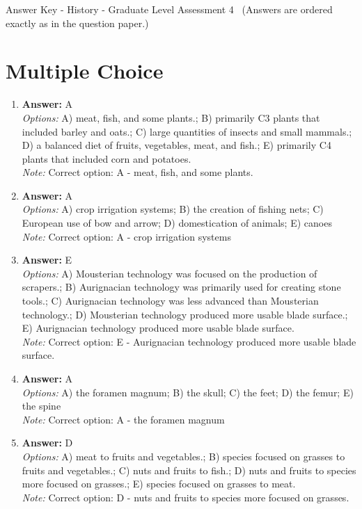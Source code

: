 \documentclass[12pt]{article}
\begin{document}
\begin{center}
Answer Key - History - Graduate Level Assessment 4 \
\small (Answers are ordered exactly as in the question paper.)
\end{center}

\section*{Multiple Choice}
\begin{enumerate}[label=\arabic*.]
\item \textbf{Answer:} A
\\ \textit{Options:} A) meat, fish, and some plants.; B) primarily C3 plants that included barley and oats.; C) large quantities of insects and small mammals.; D) a balanced diet of fruits, vegetables, meat, and fish.; E) primarily C4 plants that included corn and potatoes.
\\ \textit{Note:} Correct option: A - meat, fish, and some plants.
\item \textbf{Answer:} A
\\ \textit{Options:} A) crop irrigation systems; B) the creation of fishing nets; C) European use of bow and arrow; D) domestication of animals; E) canoes
\\ \textit{Note:} Correct option: A - crop irrigation systems
\item \textbf{Answer:} E
\\ \textit{Options:} A) Mousterian technology was focused on the production of scrapers.; B) Aurignacian technology was primarily used for creating stone tools.; C) Aurignacian technology was less advanced than Mousterian technology.; D) Mousterian technology produced more usable blade surface.; E) Aurignacian technology produced more usable blade surface.
\\ \textit{Note:} Correct option: E - Aurignacian technology produced more usable blade surface.
\item \textbf{Answer:} A
\\ \textit{Options:} A) the foramen magnum; B) the skull; C) the feet; D) the femur; E) the spine
\\ \textit{Note:} Correct option: A - the foramen magnum
\item \textbf{Answer:} D
\\ \textit{Options:} A) meat to fruits and vegetables.; B) species focused on grasses to fruits and vegetables.; C) nuts and fruits to fish.; D) nuts and fruits to species more focused on grasses.; E) species focused on grasses to meat.
\\ \textit{Note:} Correct option: D - nuts and fruits to species more focused on grasses.
\end{enumerate}
\end{document}
